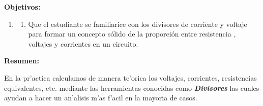 \documentclass[11pt, letterpaper]{report}
\newenvironment{enumTab}{\begin{enumerate}[label=]\item \begin{enumerate}[label=$\bullet$]}{\end{enumerate}\end{enumerate}} %
\newenvironment{block}[1]{\hspace{-0.8 cm}\textbf{\Large #1}}{\vspace{3 mm}} %
\begin{document}
 
	
	 \begin{block}{Objetivos:}
	 \begin{enumTab}
			
	\item Que el estudiante se familiarice con los divisores de corriente y voltaje para formar un concepto sólido de la proporción entre resistencia , voltajes y corrientes en un circuito.
	\end{enumTab}
	 \end{block}
		
	\begin{block}{Resumen:}
		
		En la pr'actica calculamos de manera te'orica los voltajes, corrientes, resistencias equivalentes, etc. mediante las herramientas conocidas como \textbf{\emph{Divisores}} las cuales ayudan a hacer un an'alisis m'as f'acil en la mayoria de casos. 
	\end{block}
		
\end{document}
